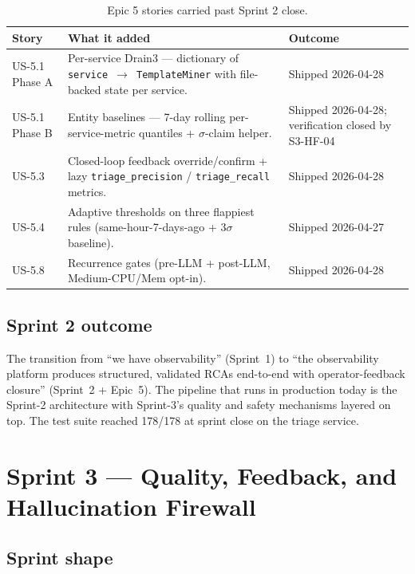 \documentclass[11pt,a4paper,oneside]{report}
\begin{document}
\begin{table}[h]
\centering
\small
\begin{tabular}{p{} p{} p{}}
\toprule
\textbf{Story} & \textbf{What it added} & \textbf{Outcome} \\
\midrule
US-5.1 Phase A & Per-service Drain3 --- dictionary of \texttt{service
$\to$ TemplateMiner} with file-backed state per service. & Shipped
2026-04-28 \\
US-5.1 Phase B & Entity baselines --- 7-day rolling per-service-metric
quantiles + $\sigma$-claim helper. & Shipped 2026-04-28; verification
closed by S3-HF-04 \\
US-5.3 & Closed-loop feedback override/confirm + lazy
\texttt{triage\_precision} / \texttt{triage\_recall} metrics. & Shipped
2026-04-28 \\
US-5.4 & Adaptive thresholds on three flappiest rules
(same-hour-7-days-ago + $3\sigma$ baseline). & Shipped 2026-04-27 \\
US-5.8 & Recurrence gates (pre-LLM + post-LLM, Medium-CPU/Mem opt-in).
& Shipped 2026-04-28 \\
\bottomrule
\end{tabular}
\caption{Epic 5 stories carried past Sprint 2 close.}
\label{tab:epic5}
\end{table}

\section{Sprint 2 outcome}

\begin{winbox}[title={Sprint 2 deliverables}]
The transition from ``we have observability'' (Sprint~1) to ``the
observability platform produces structured, validated RCAs end-to-end
with operator-feedback closure'' (Sprint~2 + Epic~5).  The pipeline
that runs in production today is the Sprint-2 architecture with
Sprint-3's quality and safety mechanisms layered on top.  The test
suite reached 178/178 at sprint close on the triage service.
\end{winbox}

\chapter{Sprint 3 --- Quality, Feedback, and Hallucination Firewall}
\label{ch:sprint3}

\section{Sprint shape}
\end{document}
